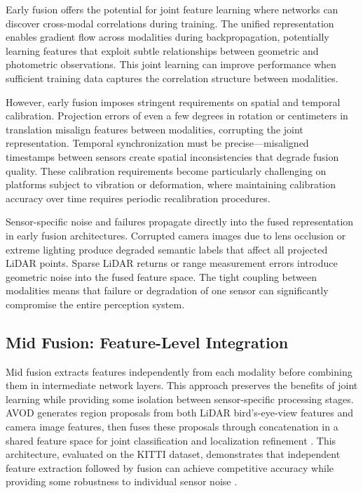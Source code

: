 \documentclass[../main.tex]{subfiles}
\begin{document}
Early fusion offers the potential for joint feature learning where networks can discover cross-modal correlations during training. The unified representation enables gradient flow across modalities during backpropagation, potentially learning features that exploit subtle relationships between geometric and photometric observations. This joint learning can improve performance when sufficient training data captures the correlation structure between modalities.

However, early fusion imposes stringent requirements on spatial and temporal calibration. Projection errors of even a few degrees in rotation or centimeters in translation misalign features between modalities, corrupting the joint representation. Temporal synchronization must be precise—misaligned timestamps between sensors create spatial inconsistencies that degrade fusion quality. These calibration requirements become particularly challenging on platforms subject to vibration or deformation, where maintaining calibration accuracy over time requires periodic recalibration procedures.

Sensor-specific noise and failures propagate directly into the fused representation in early fusion architectures. Corrupted camera images due to lens occlusion or extreme lighting produce degraded semantic labels that affect all projected LiDAR points. Sparse LiDAR returns or range measurement errors introduce geometric noise into the fused feature space. The tight coupling between modalities means that failure or degradation of one sensor can significantly compromise the entire perception system.

\subsection{Mid Fusion: Feature-Level Integration}

Mid fusion extracts features independently from each modality before combining them in intermediate network layers. This approach preserves the benefits of joint learning while providing some isolation between sensor-specific processing stages. AVOD generates region proposals from both LiDAR bird's-eye-view features and camera image features, then fuses these proposals through concatenation in a shared feature space for joint classification and localization refinement \cite{huang2024a}. This architecture, evaluated on the KITTI dataset, demonstrates that independent feature extraction followed by fusion can achieve competitive accuracy while providing some robustness to individual sensor noise \cite{huang2024a}.
\end{document}
